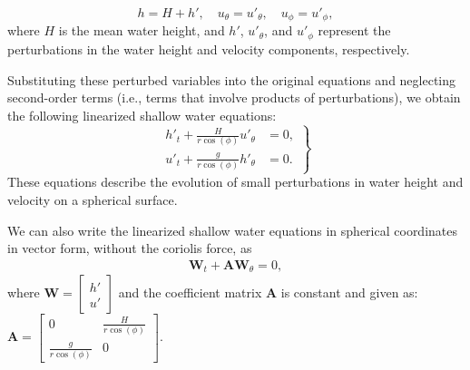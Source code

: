 \[
h = H + h', \quad u_\theta = u'_\theta, \quad u_\phi = u'_\phi,
\]
where \( H \) is the mean water height, and \( h' \), \( u'_\theta \), and \( u'_\phi \) represent the perturbations in the water height and velocity components, respectively.

Substituting these perturbed variables into the original equations and neglecting second-order terms (i.e., terms that involve products of perturbations), we obtain the following linearized shallow water equations:
\begin{equation}\label{eq:linearized_swe_spherical}
    \left.
    \begin{aligned}
        h'_t + \frac{H}{r \cos(\phi)} u'_\theta &= 0, \\
        u'_t + \frac{g}{r \cos(\phi)} h'_\theta &= 0.
    \end{aligned}
    \right\}
\end{equation}
These equations describe the evolution of small perturbations in water height and velocity on a spherical surface.


We can also write the linearized shallow water equations in spherical coordinates in vector form, without the coriolis force, as
\begin{align}\label{eq:linearized_swe_spherical_vector}
    \mathbf{W}_t + \mathbf{A} \mathbf{W}_\theta = 0,
\end{align}
where $\mathbf{W} =
\begin{bmatrix} h' \\ u' \end{bmatrix}$ and the coefficient matrix $\mathbf{A}$ is constant and given as:
$\mathbf{A} = \begin{bmatrix} 0 & \frac{H}{r \cos(\phi)} \\ \frac{g}{r \cos (\phi)} & 0 \end{bmatrix}$.


